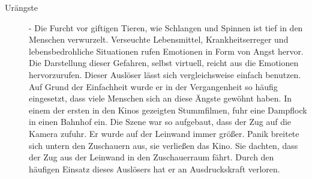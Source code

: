 \begin{description}
\item[Urängste] - Die Furcht vor giftigen Tieren, wie Schlangen und Spinnen ist tief in den Menschen verwurzelt. Verseuchte Lebensmittel, Krankheitserreger und lebensbedrohliche Situationen rufen Emotionen in Form von Angst hervor. Die Darstellung dieser Gefahren, selbst virtuell, reicht aus die Emotionen hervorzurufen. Dieser Auslöser lässt sich vergleichsweise einfach benutzen. Auf Grund der Einfachheit wurde er in der Vergangenheit so häufig eingesetzt, dass viele Menschen sich an diese Ängste gewöhnt haben. \cite[S. 28 f.]{Adams:1515529}
In einem der ersten in den Kinos gezeigten Stummfilmen, fuhr eine Dampflock in einen Bahnhof ein. Die Szene war so aufgebaut, dass der Zug auf die Kamera zufuhr. Er wurde auf der Leinwand immer größer. Panik breitete sich untern den Zuschauern aus, sie verließen das Kino. Sie dachten, dass der Zug aus der Leinwand in den Zuschauerraum fährt. \cite[S. 153]{Karasek:1994vb} Durch den häufigen Einsatz dieses Auslösers hat er an Ausdruckskraft verloren. \cite[S. 28 f.]{Adams:1515529}
%
%
%


\end{description}
